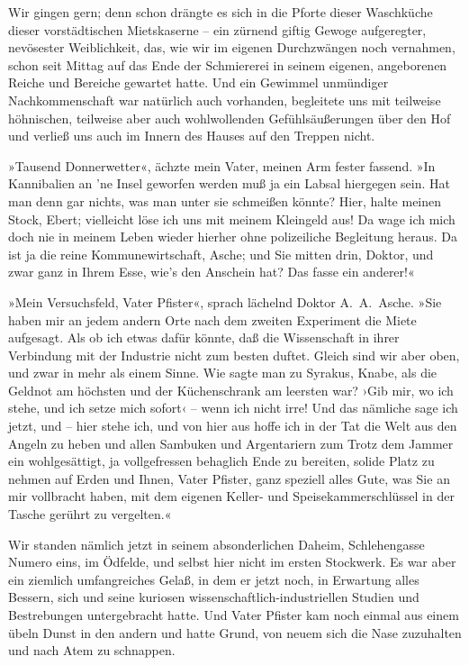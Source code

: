 Wir gingen gern; denn schon drängte es sich in die Pforte dieser
Waschküche dieser vorstädtischen Mietskaserne – ein zürnend giftig
Gewoge aufgeregter, nevösester Weiblichkeit, das, wie wir im
eigenen Durchzwängen noch vernahmen, schon seit Mittag auf das Ende
der Schmiererei in seinem eigenen, angeborenen Reiche und Bereiche
gewartet hatte. Und ein Gewimmel unmündiger Nachkommenschaft war
natürlich auch vorhanden, begleitete uns mit teilweise höhnischen,
teilweise aber auch wohlwollenden Gefühlsäußerungen über den Hof
und verließ uns auch im Innern des Hauses auf den Treppen nicht.

»Tausend Donnerwetter«, ächzte mein Vater, meinen Arm fester
fassend. »In Kannibalien an 'ne Insel geworfen werden muß ja ein
Labsal hiergegen sein. Hat man denn gar nichts, was man unter sie
schmeißen könnte? Hier, halte meinen Stock, Ebert; vielleicht löse
ich uns mit meinem Kleingeld aus! Da wage ich mich doch nie in
meinem Leben wieder hierher ohne polizeiliche Begleitung heraus. Da
ist ja die reine Kommunewirtschaft, Asche; und Sie mitten drin,
Doktor, und zwar ganz in Ihrem Esse, wie's den Anschein hat? Das
fasse ein anderer!«

»Mein Versuchsfeld, Vater Pfister«, sprach lächelnd Doktor
A.~A.~Asche. »Sie haben mir an jedem andern Orte nach dem zweiten
Experiment die Miete aufgesagt. Als ob ich etwas dafür könnte, daß
die Wissenschaft in ihrer Verbindung mit der Industrie nicht zum
besten duftet. Gleich sind wir aber oben, und zwar in mehr als
einem Sinne. Wie sagte man zu Syrakus, Knabe, als die Geldnot am
höchsten und der Küchenschrank am leersten war? ›Gib mir, wo ich
stehe, und ich setze mich sofort‹ – wenn ich nicht irre! Und das
nämliche sage ich jetzt, und – hier stehe ich, und von hier aus
hoffe ich in der Tat die Welt aus den Angeln zu heben und allen
Sambuken und Argentariern zum Trotz dem Jammer ein wohlgesättigt,
ja vollgefressen behaglich Ende zu bereiten, solide Platz zu nehmen
auf Erden und Ihnen, Vater Pfister, ganz speziell alles Gute, was
Sie an mir vollbracht haben, mit dem eigenen Keller- und
Speisekammerschlüssel in der Tasche gerührt zu vergelten.«

Wir standen nämlich jetzt in seinem absonderlichen Daheim,
Schlehengasse Numero eins, im Ödfelde, und selbst hier nicht im
ersten Stockwerk. Es war aber ein ziemlich umfangreiches Gelaß, in
dem er jetzt noch, in Erwartung alles Bessern, sich und seine
kuriosen wissenschaftlich-industriellen Studien und Bestrebungen
untergebracht hatte. Und Vater Pfister kam noch einmal aus einem
übeln Dunst in den andern und hatte Grund, von neuem sich die Nase
zuzuhalten und nach Atem zu schnappen.

